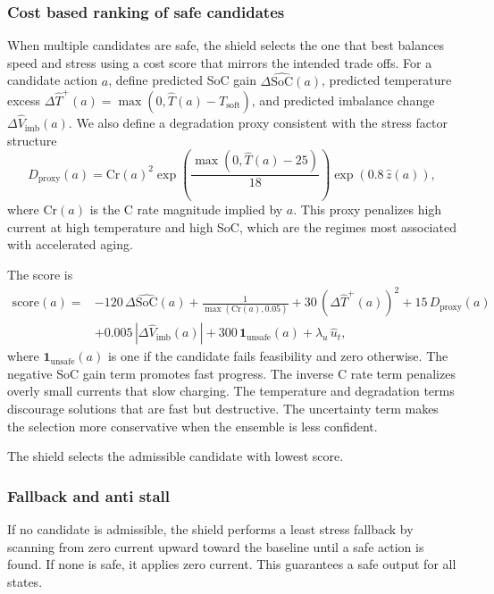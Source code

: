 \documentclass[%
 aip,
 amsmath,amssymb,
reprint, onecolumn %
]{revtex4-1}
\begin{document}
\subsubsection{Cost based ranking of safe candidates}
When multiple candidates are safe, the shield selects the one that best balances speed and stress using a cost score that mirrors the intended trade offs. For a candidate action $a$, define predicted SoC gain $\Delta \widehat{\mathrm{SoC}}(a)$, predicted temperature excess $\Delta \hat T^+(a)=\max(0,\hat T(a)-T_{\mathrm{soft}})$, and predicted imbalance change $\Delta \hat V_{\mathrm{imb}}(a)$. We also define a degradation proxy consistent with the stress factor structure
\begin{equation}
D_{\mathrm{proxy}}(a) = \mathrm{Cr}(a)^2
\exp\!\left(\frac{\max(0,\hat T(a)-25)}{18}\right)
\exp\!\left(0.8\,\hat z(a)\right),
\end{equation}
where $\mathrm{Cr}(a)$ is the C rate magnitude implied by $a$. This proxy penalizes high current at high temperature and high SoC, which are the regimes most associated with accelerated aging.

The score is
\begin{equation}
\begin{aligned}
\mathrm{score}(a) =& -120\,\Delta \widehat{\mathrm{SoC}}(a)
+ \frac{1}{\max(\mathrm{Cr}(a),0.05)}
+ 30\,(\Delta \hat T^+(a))^2
+ 15\,D_{\mathrm{proxy}}(a) \\
&+ 0.005\,\left|\Delta \hat V_{\mathrm{imb}}(a)\right|
+ 300\,\mathbf{1}_{\mathrm{unsafe}}(a)
+ \lambda_u\,\hat u_t,
\end{aligned}
\end{equation}
where $\mathbf{1}_{\mathrm{unsafe}}(a)$ is one if the candidate fails feasibility and zero otherwise. The negative SoC gain term promotes fast progress. The inverse C rate term penalizes overly small currents that slow charging. The temperature and degradation terms discourage solutions that are fast but destructive. The uncertainty term makes the selection more conservative when the ensemble is less confident.

The shield selects the admissible candidate with lowest score.

\subsubsection{Fallback and anti stall}
If no candidate is admissible, the shield performs a least stress fallback by scanning from zero current upward toward the baseline until a safe action is found. If none is safe, it applies zero current. This guarantees a safe output for all states.
\end{document}
